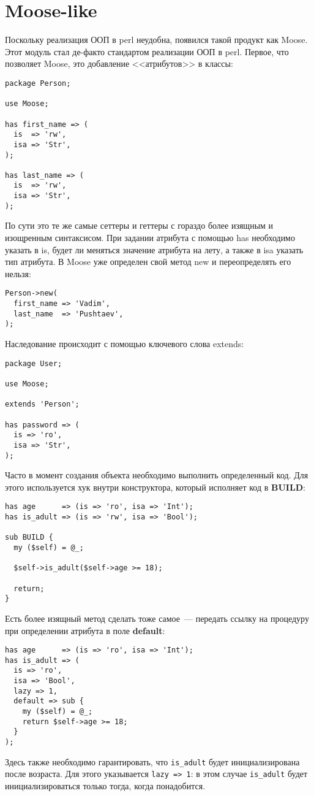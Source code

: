\section{Moose-like} %
Поскольку реализация ООП в perl неудобна, появился такой продукт как Moose. Этот модуль стал де-факто стандартом реализации ООП в perl. Первое, что позволяет Moose, это добавление <<атрибутов>> в классы:
\begin{verbatim}
package Person;

use Moose;

has first_name => (
  is  => 'rw',
  isa => 'Str',
);

has last_name => (
  is  => 'rw',
  isa => 'Str',
);
\end{verbatim}
По сути это те же самые сеттеры и геттеры с гораздо более изящным и изощренным синтаксисом. При задании атрибута с помощью has необходимо указать в is, будет ли меняться значение атрибута на лету, а также в isa указать тип атрибута. В Moose уже определен свой метод new и переопределять его нельзя:
\begin{verbatim}
Person->new(
  first_name => 'Vadim',
  last_name  => 'Pushtaev',
);
\end{verbatim}
Наследование происходит с помощью ключевого слова extends:
\begin{verbatim}
package User;

use Moose;

extends 'Person';

has password => (
  is => 'ro',
  isa => 'Str',
);
\end{verbatim}
Часто в момент создания объекта необходимо выполнить определенный код. Для этого используется хук внутри конструктора, который исполняет код в \textbf{BUILD}:
\begin{verbatim}
has age      => (is => 'ro', isa => 'Int');
has is_adult => (is => 'rw', isa => 'Bool');

sub BUILD {
  my ($self) = @_;

  $self->is_adult($self->age >= 18);

  return;
}
\end{verbatim}
Есть более изящный метод сделать тоже самое~--- передать ссылку на процедуру при определении атрибута в поле \textbf{default}:
\begin{verbatim}
has age      => (is => 'ro', isa => 'Int');
has is_adult => (
  is => 'ro',
  isa => 'Bool',
  lazy => 1,
  default => sub {
    my ($self) = @_;
    return $self->age >= 18;
  }
);
\end{verbatim}
Здесь также необходимо гарантировать, что \verb|is_adult| будет инициализирована после возраста. Для этого указывается \verb|lazy => 1|: в этом случае \verb|is_adult| будет инициализироваться только тогда, когда понадобится.

